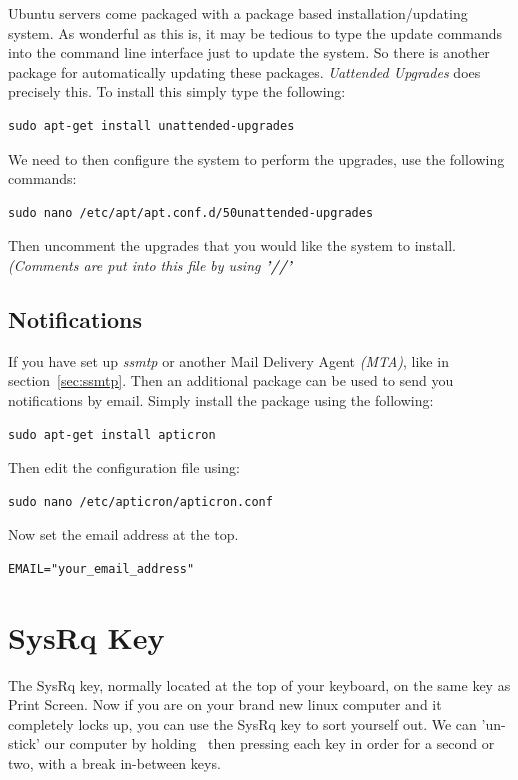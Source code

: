 Ubuntu servers come packaged with a package based installation/updating system.  As wonderful as this is, it may be tedious to type the update commands into the command line interface just to update the system.  So there is another package for automatically updating these packages.  \textit{Uattended Upgrades} does precisely this.  To install this simply type the following:

\begin{lstlisting}
sudo apt-get install unattended-upgrades
\end{lstlisting}

We need to then configure the system to perform the upgrades, use the following commands:

\begin{lstlisting}
sudo nano /etc/apt/apt.conf.d/50unattended-upgrades
\end{lstlisting}

Then uncomment the upgrades that you would like the system to install.  \textit{(Comments are put into this file by using \textbf{'//'}}


\subsection{Notifications}

If you have set up \textit{ssmtp} or another Mail Delivery Agent \textit{(MTA)}, like in section~\ref{sec:ssmtp}.  Then an additional package can be used to send you notifications by email.  Simply install the package using the following:

\begin{lstlisting}
sudo apt-get install apticron
\end{lstlisting}

Then edit the configuration file using:

\begin{lstlisting}
sudo nano /etc/apticron/apticron.conf
\end{lstlisting}

Now set the email address at the top.

\begin{verbatim}
EMAIL="your_email_address"
\end{verbatim}


\section{SysRq Key}

The SysRq key, normally located at the top of your keyboard, on the same key as Print Screen.  Now if you are on your brand new linux computer and it completely locks up, you can use the SysRq key to sort yourself out.  We can 'un-stick' our computer by holding~ then pressing each key in order for a second or two, with a break in-between keys.

